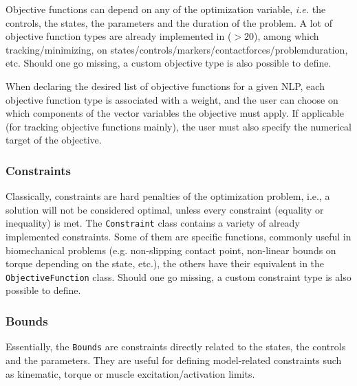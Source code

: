 Objective functions can depend on any of the optimization variable, \textit{i.e.} the controls, the states, the parameters and the duration of the problem. 
A lot of objective function types are already implemented in \bioptim ($>\!20$), among which tracking\:/\:minimizing, on states\:/\:controls\:/\:markers\:/\:contact\:forces\:/\:problem\:duration, etc. 
Should one go missing, a custom objective type is also possible to define.

When declaring the desired list of objective functions for a given NLP, each objective function type is associated with a weight, and the user can choose on which components of the vector variables the objective must apply. 
If applicable (for tracking objective functions mainly), the user must also specify the numerical target of the objective.

\subsubsection{Constraints}
Classically, constraints are hard penalties of the optimization problem, i.e., a solution will not be considered optimal, unless every constraint (equality or inequality) is met.
The \texttt{Constraint} class contains a variety of already implemented constraints.
Some of them are specific functions, commonly useful in biomechanical problems (e.g. non-slipping contact point, non-linear bounds on torque depending on the state, etc.), the others  
have their equivalent in the \texttt{ObjectiveFunction} class.
Should one go missing, a custom constraint type is also possible to define.

\subsubsection{Bounds}
Essentially, the \texttt{Bounds} are constraints directly related to the states, the controls and the parameters.
They are useful for defining model-related constraints such as kinematic, torque or muscle excitation\:/\:activation limits. 


